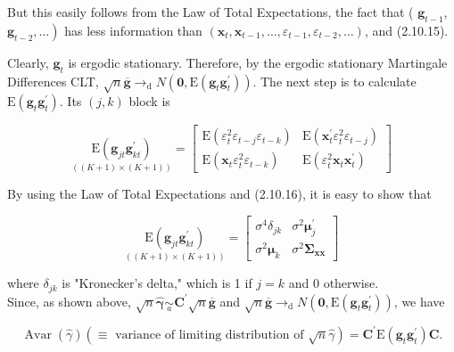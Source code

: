 \documentclass[10pt]{article}
\begin{document}
But this easily follows from the Law of Total Expectations, the fact that ( $\mathbf{g}_{t-1}$, $\left.\mathbf{g}_{t-2}, \ldots\right)$ has less information than $\left(\mathbf{x}_{t}, \mathbf{x}_{t-1}, \ldots, \varepsilon_{t-1}, \varepsilon_{t-2}, \ldots\right)$, and (2.10.15).

Clearly, $\mathbf{g}_{t}$ is ergodic stationary. Therefore, by the ergodic stationary Martingale Differences CLT, $\sqrt{n} \overline{\mathbf{g}} \rightarrow_{\mathrm{d}} N\left(\mathbf{0}, \mathrm{E}\left(\mathbf{g}_{t} \mathbf{g}_{t}^{\prime}\right)\right)$. The next step is to calculate $\mathrm{E}\left(\mathbf{g}_{t} \mathbf{g}_{t}^{\prime}\right)$. Its $(j, k)$ block is

$$
\underset{((K+1) \times(K+1))}{\mathrm{E}\left(\mathbf{g}_{j t} \mathbf{g}_{k t}^{\prime}\right)}=\left[\begin{array}{cc}
\mathrm{E}\left(\varepsilon_{t}^{2} \varepsilon_{t-j} \varepsilon_{t-k}\right) & \mathrm{E}\left(\mathbf{x}_{t}^{\prime} \varepsilon_{t}^{2} \varepsilon_{t-j}\right) \\
\mathrm{E}\left(\mathbf{x}_{t} \varepsilon_{t}^{2} \varepsilon_{t-k}\right) & \mathrm{E}\left(\varepsilon_{t}^{2} \mathbf{x}_{t} \mathbf{x}_{t}^{\prime}\right)
\end{array}\right]
$$

By using the Law of Total Expectations and (2.10.16), it is easy to show that

\[
\underset{((K+1) \times(K+1))}{\mathrm{E}\left(\mathbf{g}_{j t} \mathbf{g}_{k t}^{\prime}\right)}=\left[\begin{array}{cc}
\sigma^{4} \delta_{j k} & \sigma^{2} \boldsymbol{\mu}_{j}^{\prime}  \tag{2.B.2}\\
\sigma^{2} \boldsymbol{\mu}_{k} & \sigma^{2} \mathbf{\Sigma}_{\mathbf{x x}}
\end{array}\right]
\]

where $\delta_{j k}$ is "Kronecker's delta," which is 1 if $j=k$ and 0 otherwise.\\
Since, as shown above, $\sqrt{n} \hat{\boldsymbol{\gamma}} \underset{a}{\sim} \mathbf{C}^{\prime} \sqrt{n} \overline{\mathbf{g}}$ and $\sqrt{n} \overline{\mathbf{g}} \rightarrow_{\mathrm{d}} N\left(\mathbf{0}, \mathrm{E}\left(\mathbf{g}_{t} \mathbf{g}_{t}^{\prime}\right)\right)$, we have

$$
\operatorname{Avar}(\hat{\gamma})(\equiv \text { variance of limiting distribution of } \sqrt{n} \hat{\gamma})=\mathbf{C}^{\prime} \mathrm{E}\left(\mathbf{g}_{t} \mathbf{g}_{t}^{\prime}\right) \mathbf{C} .
$$
\end{document}
